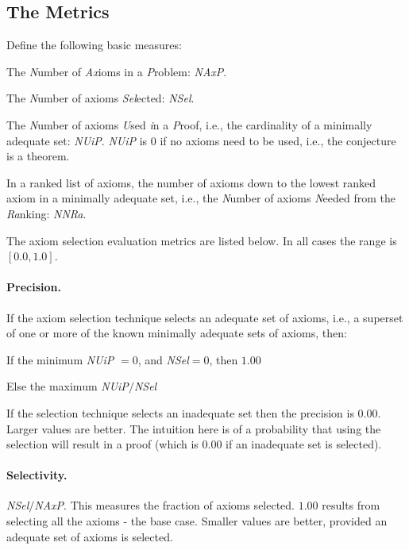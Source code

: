 \documentclass[]{ceurart}
\newenvironment{packed_itemize}{
\vspace*{-0.5em}
\begin{itemize}
  \setlength{\partopsep}{0pt}
  \setlength{\itemsep}{1pt}
  \setlength{\parskip}{0pt}
  \setlength{\parsep}{0pt}
}{\end{itemize}}
\begin{document}
\subsection{The Metrics}
\label{TheMetrics}

Define the following basic measures:
\begin{packed_itemize}
\item The \emph{N}umber of \emph{Ax}ioms in a \emph{P}roblem: \emph{NAxP}.
\item The \emph{N}umber of axioms \emph{Sel}ected: \emph{NSel}.
\item The \emph{N}umber of axioms \emph{U}sed \emph{i}n a \emph{P}roof, 
      i.e., the cardinality of a minimally adequate set: \emph{NUiP}.
      \emph{NUiP} is $0$ if no axioms need to be used, i.e., the conjecture 
      is a theorem.
\item In a ranked list of axioms, the number of axioms down to the lowest 
      ranked axiom in a minimally adequate set, i.e., the \emph{N}umber 
      of axioms \emph{N}eeded from the \emph{Ra}nking: \emph{NNRa}.
\end{packed_itemize}

The axiom selection evaluation metrics are listed below.
In all cases the range is $[0.0,1.0]$.

\paragraph{Precision.}
If the axiom selection technique selects an adequate set of axioms, i.e., a 
superset of one or more of the known minimally adequate sets of axioms, then:
\begin{packed_itemize}
\item If the minimum \emph{NUiP} $= 0$, and \emph{NSel}$ = 0$, then $1.00$
\item Else the maximum \emph{NUiP}$/$\emph{NSel} 
\end{packed_itemize}
If the selection technique selects an inadequate set then the precision
is $0.00$.
Larger values are better.
The intuition here is of a probability that using the selection will result
in a proof (which is $0.00$ if an inadequate set is selected).

\paragraph{Selectivity.}
\emph{NSel}$/$\emph{NAxP}.
This measures the fraction of axioms selected.
$1.00$ results from selecting all the axioms - the base case.
Smaller values are better, provided an adequate set of axioms is selected.
\end{document}
